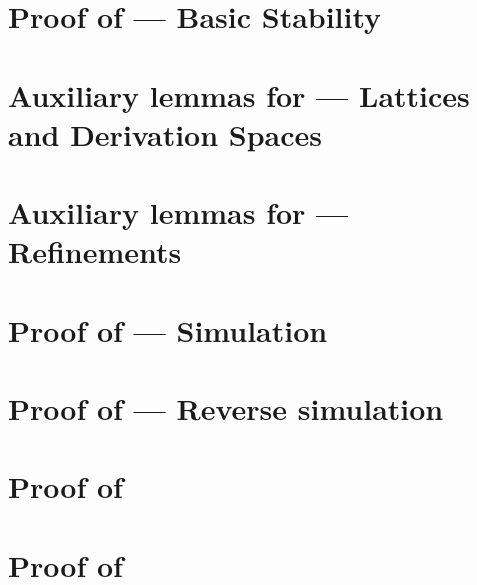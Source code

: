 \section{Proof of  --- Basic Stability}
\label{basic_stability_proof}


\section{Auxiliary lemmas for  --- Lattices and Derivation Spaces}
\label{lemmas_lattices_and_derivation_spaces_proof}


\section{Auxiliary lemmas for  --- Refinements}
\label{refinements_proof}


\section{Proof of  --- Simulation}
\label{simulation_proof}


\section{Proof of  --- Reverse simulation}
\label{reverse_simulation_proof}


\section{Proof of }
\label{hnf_has_refinement_proof}


\section{Proof of }
\label{has_hnf_has_refinement_proof}




